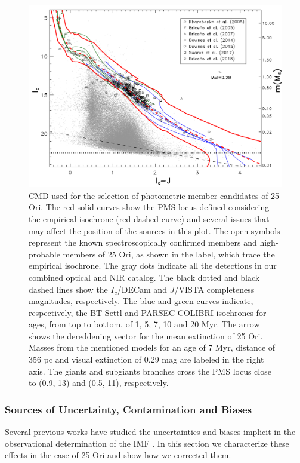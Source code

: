 \documentclass[12pt]{article}
\begin{document}
\begin{figure}[ht!]
	\includegraphics[width=1.0\textwidth]{f_2.pdf}
	\caption[$I_c$ vs $I_c-J$ diagram for the selection of the photometric member candidates.]{CMD used for the selection of photometric member candidates of 25 Ori. The red solid curves show the PMS locus defined considering the empirical isochrone (red dashed curve) and several issues that may affect the position of the sources in this plot. The open symbols represent the known spectroscopically confirmed members \citep{Briceno2005,Briceno2007,Downes2014,Downes2015,Suarez2017,Briceno2018} and high-probable members \citep{Kharchenko2005} of 25 Ori, as shown in the label, which trace the empirical isochrone. The gray dots indicate all the detections in our combined optical and NIR catalog. The black dotted and black dashed lines show the $I_c$/DECam and $J$/VISTA completeness magnitudes, respectively. The blue and green curves indicate, respectively, the BT-Settl and PARSEC-COLIBRI isochrones for ages, from top to bottom, of 1, 5, 7, 10 and 20 Myr. The arrow shows the dereddening vector for the mean extinction of 25 Ori. Masses from the mentioned models for an age of 7 Myr, distance of 356 pc and visual extinction of 0.29 mag are labeled in the right axis. The giants and subgiants branches cross the PMS locus close to (0.9, 13) and (0.5, 11), respectively.}
	\label{fig_IMF:CMD}
\end{figure}

\subsubsection{Sources of Uncertainty, Contamination and Biases}
\label{sec_IMF:uncertainties}
Several previous works have studied the uncertainties and biases implicit in the observational determination of the IMF \citep[e.g.][]{Moraux2003,Moraux2007a,Moraux2007b,Ascenso2011,Dib2017}. In this section we characterize these effects in the case of 25 Ori and show how we corrected them.
\end{document}
